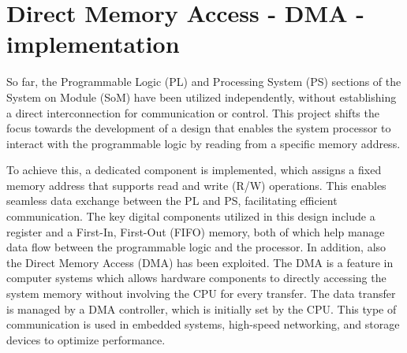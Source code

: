 \chapter{Direct Memory Access - DMA - implementation}
\label{ch:dma}
So far, the Programmable Logic (PL) and Processing System (PS) sections of the System on Module (SoM) have been utilized independently, without establishing a direct interconnection for communication or control. This project shifts the focus towards the development of a design that enables the system processor to interact with the programmable logic by reading from a specific memory address.

To achieve this, a dedicated component is implemented, which assigns a fixed memory address that supports read and write (R/W) operations. This enables seamless data exchange between the PL and PS, facilitating efficient communication. The key digital components utilized in this design include a register and a First-In, First-Out (FIFO) memory, both of which help manage data flow between the programmable logic and the processor. In addition, also the Direct Memory Access (DMA) has been exploited. The DMA is a feature in computer systems which allows hardware components to directly accessing the system memory without involving the CPU for every transfer. The data transfer is managed by a DMA controller, which is initially set by the CPU. This type of communication is used in embedded systems, high-speed networking, and storage devices to optimize performance. 

